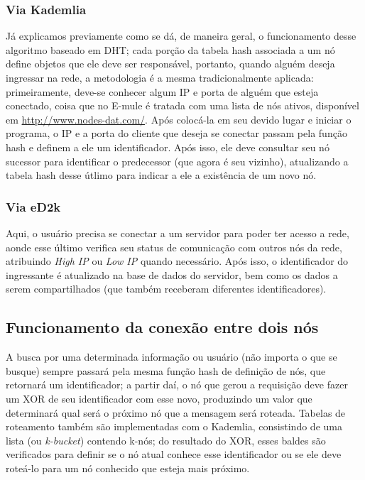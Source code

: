 \documentclass[a4paper]{article}
\begin{document}
		\subsubsection{Via Kademlia}
		Já explicamos previamente como se dá, de maneira geral, o funcionamento desse algoritmo baseado em DHT; cada porção da 
tabela hash associada a um nó define objetos que ele deve ser responsável, portanto, quando alguém deseja ingressar na rede, a metodologia 
é a mesma tradicionalmente aplicada: primeiramente, deve-se conhecer algum IP e porta de alguém que esteja conectado, coisa que no E-mule 
é tratada com uma lista de nós ativos, disponível em \url{http://www.nodes-dat.com/}. Após colocá-la em seu devido lugar e iniciar o 
programa, o IP e a porta do cliente que deseja se conectar passam pela função hash e definem a ele um identificador. Após isso, ele deve 
consultar seu nó sucessor para identificar o predecessor (que agora é seu vizinho), atualizando a tabela hash desse útlimo para indicar a 
ele a existência de um novo nó.

		\subsubsection{Via eD2k}
		Aqui, o usuário precisa se conectar a um servidor para poder ter acesso a rede, aonde esse último verifica seu status de 
comunicação com outros nós da rede, atribuindo \textit{High IP} ou \textit{Low IP} quando necessário. Após isso, o identificador do 
ingressante é atualizado na base de dados do servidor, bem como os dados a serem compartilhados (que também receberam diferentes 
identificadores).


	\subsection{Funcionamento da conexão entre dois nós}
		A busca por uma determinada informação ou usuário (não importa o que se busque) sempre passará pela mesma função hash de 
definição de nós, que retornará um identificador; a partir daí, o nó que gerou a requisição deve fazer um XOR de seu identificador com 
esse novo, produzindo um valor que determinará qual será o próximo nó que a mensagem será roteada. Tabelas de roteamento também são 
implementadas com o Kademlia, consistindo de uma lista (ou \textit{k-bucket}) contendo k-nós; do resultado do XOR, esses baldes são 
verificados para definir se o nó atual conhece esse identificador ou se ele deve roteá-lo para um nó conhecido que esteja mais próximo.
\end{document}
